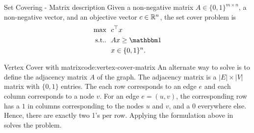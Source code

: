 

%

\begin{general}{Set Covering - Matrix description}{\npcomplete}
\label{general:set-covering-alternate}
Given a non-negative matrix $A \in \{0,1\}^{m \times n}$, a non-negative vector, and an objective vector $c \in {\mathbb{R}}^n$, the set cover problem is
\begin{equation}
\begin{split}
\max \ \ & c^\top x\\
\text{s.t.}. \ \ & Ax \geq \one \\
& x \in \{0,1\}^n.
\end{split}
\end{equation}
\end{general}
\begin{examplewithcode}{Vertex Cover with matrix}{code:vertex-cover-matrix}
An alternate way to solve  is to define the adjacency matrix $A$ of the graph.  The adjacency matrix is a $|E| \times |V|$ matrix with $\{0,1\}$ entries.  The each row corresponds to an edge $e$ and each column corresponds to a node $v$.  For an edge $e = (u,v)$, the corresponding row has a $1$ in columns corresponding to the nodes $u$ and $v$, and a 0 everywhere else.  Hence, there are exactly two 1's per row.  Applying the formulation above in  solves the problem.
\end{examplewithcode}




%
